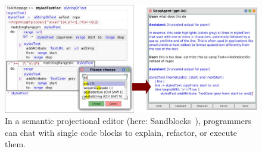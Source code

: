 \begin{figure}[Z]
	\centering
	\includegraphics[width=\linewidth]{chapters/08_application/03_system/editor.png}
	\caption[In a semantic projectional editor, programmers can chat with single code blocks to explain, refactor, or execute them.]{
		In a semantic projectional editor (here: Sandblocks~\cite{beckmann2020visual}), programmers can chat with single code blocks to explain, refactor, or execute them.
	}
	\label{fig:application/system/editor}
\end{figure}


